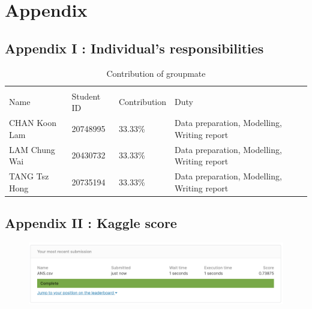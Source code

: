 \documentclass{article}
\begin{document}
\newpage

\section*{Appendix}

\subsection*{Appendix I : Individual’s responsibilities}

\begin{table}[H]
  \caption{Contribution of groupmate}
  \label{sample-table}
  \begin{tabular}{llll}
    \toprule
    \multicolumn{2}{c}{}                   \\
    Name     & Student ID   & Contribution & Duty \\
    \midrule
    CHAN Koon Lam & 20748995  & 33.33\% & Data preparation, Modelling, Writing report \\
    LAM Chung Wai & 20430732 & 33.33\% & Data preparation, Modelling, Writing report \\
    TANG Tsz Hong & 20735194 & 33.33\% & Data preparation, Modelling, Writing report \\
    \bottomrule
  \end{tabular}
\end{table}

 \mbox{}

\subsection*{Appendix II : Kaggle score}
\begin{figure}[H]
  \centering
  \includegraphics [width=16cm]{download5.png}
\end{figure}



\small

\end{document}
